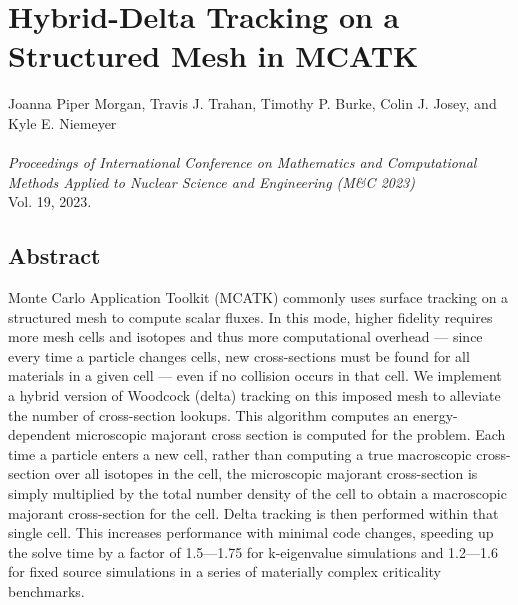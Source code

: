\renewcommand{\TheTitle}{Hybrid-Delta Tracking on a Structured Mesh in MCATK}
\renewcommand{\TheAuthors}{Joanna Piper Morgan,
  Travis J. Trahan,
  Timothy P. Burke,
  Colin J. Josey, 
  and Kyle E. Niemeyer\\ \\}
  
\renewcommand{\TheAddress}{%
    \textit{Proceedings of International Conference on Mathematics and Computational Methods Applied to Nuclear Science and Engineering (M\&C 2023)} \\
    Vol. 19, 2023. \\
    \arxiv{2306.07847}
}

\chapter{\TheTitle}
\label{chapter:mcatk_paper}

\vspace{1em}
\TheAuthors 
\vspace{1em}
\TheAddress
\vspace{1em}




\section*{Abstract}
Monte Carlo Application Toolkit (MCATK) commonly uses surface tracking on a structured mesh to compute scalar fluxes. In this mode, higher fidelity requires more mesh cells and isotopes and thus more computational overhead --- since every time a particle changes cells, new cross-sections must be found for all materials in a given cell --- even if no collision occurs in that cell. We implement a hybrid version of Woodcock (delta) tracking on this imposed mesh to alleviate the number of cross-section lookups. This algorithm computes an energy-dependent microscopic majorant cross section is computed for the problem. Each time a particle enters a new cell, rather than computing a true macroscopic cross-section over all isotopes in the cell, the microscopic majorant cross-section is simply multiplied by the total number density of the cell to obtain a macroscopic majorant cross-section for the cell. Delta tracking is then performed within that single cell. This increases performance with minimal code changes, speeding up the solve time by a factor of 1.5---1.75 for k-eigenvalue simulations and 1.2---1.6 for fixed source simulations in a series of materially complex criticality benchmarks.

